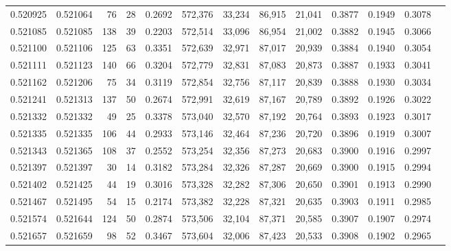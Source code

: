 \begin{tabular}{rrrrrrrrrrrrr}
0.520925 & 0.521064 &    76 &    28 &                                     0.2692 & 572,376 &  33,234 &  86,915 &  21,041 & 0.3877 & 0.1949 & 0.3078 \\
0.521085 & 0.521085 &   138 &    39 &                                     0.2203 & 572,514 &  33,096 &  86,954 &  21,002 & 0.3882 & 0.1945 & 0.3066 \\
0.521100 & 0.521106 &   125 &    63 &                                     0.3351 & 572,639 &  32,971 &  87,017 &  20,939 & 0.3884 & 0.1940 & 0.3054 \\
0.521111 & 0.521123 &   140 &    66 &                                     0.3204 & 572,779 &  32,831 &  87,083 &  20,873 & 0.3887 & 0.1933 & 0.3041 \\
0.521162 & 0.521206 &    75 &    34 &                                     0.3119 & 572,854 &  32,756 &  87,117 &  20,839 & 0.3888 & 0.1930 & 0.3034 \\
0.521241 & 0.521313 &   137 &    50 &                                     0.2674 & 572,991 &  32,619 &  87,167 &  20,789 & 0.3892 & 0.1926 & 0.3022 \\
0.521332 & 0.521332 &    49 &    25 &                                     0.3378 & 573,040 &  32,570 &  87,192 &  20,764 & 0.3893 & 0.1923 & 0.3017 \\
0.521335 & 0.521335 &   106 &    44 &                                     0.2933 & 573,146 &  32,464 &  87,236 &  20,720 & 0.3896 & 0.1919 & 0.3007 \\
0.521343 & 0.521365 &   108 &    37 &                                     0.2552 & 573,254 &  32,356 &  87,273 &  20,683 & 0.3900 & 0.1916 & 0.2997 \\
0.521397 & 0.521397 &    30 &    14 &                                     0.3182 & 573,284 &  32,326 &  87,287 &  20,669 & 0.3900 & 0.1915 & 0.2994 \\
0.521402 & 0.521425 &    44 &    19 &                                     0.3016 & 573,328 &  32,282 &  87,306 &  20,650 & 0.3901 & 0.1913 & 0.2990 \\
0.521467 & 0.521495 &    54 &    15 &                                     0.2174 & 573,382 &  32,228 &  87,321 &  20,635 & 0.3903 & 0.1911 & 0.2985 \\
0.521574 & 0.521644 &   124 &    50 &                                     0.2874 & 573,506 &  32,104 &  87,371 &  20,585 & 0.3907 & 0.1907 & 0.2974 \\
0.521657 & 0.521659 &    98 &    52 &                                     0.3467 & 573,604 &  32,006 &  87,423 &  20,533 & 0.3908 & 0.1902 & 0.2965 \\

\end{tabular}

